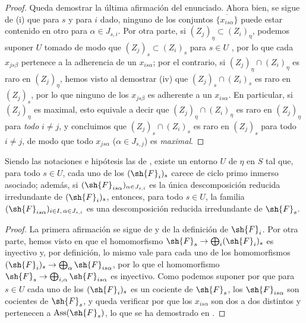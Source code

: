 \begin{proof}
Queda demostrar la última afirmación del enunciado.
Ahora bien, se sigue de (i) que para $s$ y para $i$ dado, ninguno de los conjuntos $\overline{\{x_{is\alpha}\}}$ puede estar contenido en otro para $\alpha\in J_{s,i}$.
Por otra parte, si $(Z_j)_\eta\subset(Z_i)_\eta$, podemos suponer $U$ tomado de modo que $(Z_j)_s\subset(Z_i)_s$ para $s\in U$ , por lo que cada $x_{js\beta}$ pertenece a la adherencia de un $x_{is\alpha}$; por el contrario, si $(Z_j)_\eta\cap(Z_i)_\eta$ es raro en $(Z_j)_\eta$, hemos visto al demostrar (iv) que $(Z_j)_s\cap(Z_i)_s$ es raro en $(Z_j)_s$, por lo que ninguno de los $x_{js\beta}$ es adherente a un $x_{is\alpha}$.
En particular, si $(Z_j)_\eta$ es maximal, esto equivale a decir que $(Z_j)_\eta\cap(Z_i)_\eta$ es raro en $(Z_j)_\eta$ para \emph{todo} $i\neq j$, y concluimos que $(Z_j)_s\cap(Z_i)_s$ es raro en $(Z_j)_s$ para todo $i\neq j$, de modo que todo $x_{js\alpha}$ ($\alpha\in J_{s,j}$) es \emph{maximal}.
\end{proof}

\begin{corollary}[9.8.4]
\label{IV.9.8.4}
Siendo las notaciones e hipótesis las de \emph{}, existe un entorno $U$ de $\eta$ en $S$ tal que, para todo $s\in U$, cada uno de los $(\sh{F}_i)_s$ carece de ciclo primo inmerso asociado; además, si $(\sh{F}_{is\alpha})_{\alpha\in J_{s,i}}$ es la única descomposición reducida irredundante de $(\sh{F}_i)_s$, entonces, para todo $s\in U$, la familia $(\sh{F}_{is\alpha})_{i\in I,\,\alpha\in J_{s,i}}$ es una descomposición reducida irredundante de $\sh{F}_s$.
\end{corollary}

\begin{proof}
\label{IV.9.8.4-proof}
La primera afirmación se sigue de  y de la definición de $\sh{F}_i$.
Por otra parte, hemos visto en  que el homomorfismo $\sh{F}_s\to\bigoplus_i(\sh{F}_i)_s$ es inyectivo y, por definición, lo mismo vale para cada uno de los homomorfismos $(\sh{F}_i)_s\to\bigoplus_\alpha\sh{F}_{is\alpha}$, por lo que el homomorfismo $\sh{F}_s\to\bigoplus_{i,\alpha}\sh{F}_{is\alpha}$ es inyectivo.
Como podemos suponer por  que para $s\in U$ cada uno de los $(\sh{F}_i)_s$ es un cociente de $\sh{F}_s$, los $\sh{F}_{is\alpha}$ son cocientes de $\sh{F}_s$, y queda verificar por  que los $x_{is\alpha}$ son dos a dos distintos y pertenecen a $\operatorname{Ass}(\sh{F}_s)$, lo que se ha demostrado en .
\end{proof}

